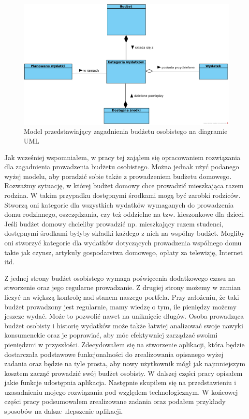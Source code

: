 \documentclass[shortabstract,inz]{iithesis}
\begin{document}
\begin{figure}
	\centering
	\includegraphics[scale=0.75]{domain-model.png}
	\caption{Model przedstawiający zagadnienia budżetu osobistego na diagramie UML}
	\label{fig:domain-model}
\end{figure}

Jak wcześniej wspomniałem, w pracy tej zająłem się opracowaniem rozwiązania dla zagadnienia prowadzenia budżetu osobistego. Można jednak użyć podanego wyżej modelu, aby poradzić sobie także z prowadzeniem budżetu domowego. Rozważmy sytuację, w której budżet domowy chce prowadzić mieszkająca razem rodzina. W takim przypadku dostępnymi środkami mogą być zarobki rodziców. Stworzą oni kategorie dla wszystkich wydatków wymaganych do prowadzenia domu rodzinnego, oszczędzania, czy też oddzielne na tzw. kieszonkowe dla dzieci. Jeśli budżet domowy chcieliby prowadzić np. mieszkający razem studenci, dostępnymi środkami byłyby składki każdego z nich na wspólny budżet. Mogliby oni stworzyć kategorie dla wydatków dotyczących prowadzenia wspólnego domu takie jak czynsz, artykuły gospodarstwa domowego, opłaty za telewizję, Internet itd.

Z jednej strony budżet osobistego wymaga poświęcenia dodatkowego czasu na stworzenie oraz jego regularne prowadzanie. Z drugiej strony możemy w zamian liczyć na większą kontrolę nad stanem naszego portfela. Przy założeniu, że taki budżet prowadzony jest regularnie, mamy wiedzę o tym, ile pieniędzy możemy jeszcze wydać. Może to pozwolić nawet na uniknięcie długów. Osoba prowadząca budżet osobisty i historię wydatków może także łatwiej analizować swoje nawyki konsumenckie oraz je poprawiać, aby móc efektywniej zarządzać swoimi pieniędzmi w przyszłości.
\bigbreak
Zdecydowałem się na stworzenie aplikacji, która będzie dostarczała  podstawowe funkcjonalności do zrealizowania opisanego wyżej zadania oraz będzie na tyle prosta, aby nowy użytkownik mógł jak najmniejszym kosztem zacząć prowadzić swój budżet osobisty. W dalszej części pracy opisałem jakie funkcje udostępnia aplikacja. Następnie skupiłem się na przedstawieniu i uzasadnieniu mojego rozwiązania pod względem technologicznym. W końcowej części pracy podsumowałem zrealizowane zadania oraz podałem przykłady sposobów na dalsze ulepszenie aplikacji.
\end{document}
